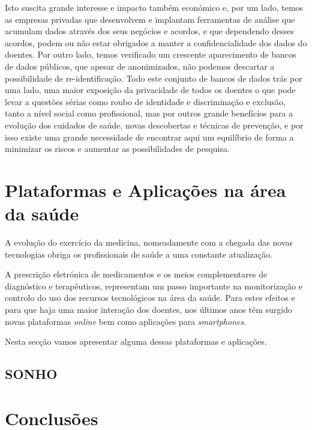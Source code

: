 \documentclass[conference]{IEEEtran}
\begin{document}
Isto suscita grande interesse e impacto também económico e, por um lado, temos as empresas privadas que desenvolvem e implantam ferramentas de análise que acumulam dados através dos seus negócios e acordos, e que dependendo desses acordos, podem ou não estar obrigados a manter a confidencialidade dos dados do doentes. Por outro lado, temos verificado um crescente aparecimento de bancos de dados públicos, que apesar de anonimizados, não podemos descartar a possibilidade de re-identificação. Todo este conjunto de bancos de dados trás por uma lado, uma maior exposição da privacidade de todos os doentes o que pode levar a questões sérias como roubo de identidade e discriminação e exclusão, tanto a nível social como profissional, mas por outros grande benefícios para a evolução dos cuidados de saúde, novas descobertas e técnicas de prevenção, e por isso existe uma grande necessidade de encontrar aqui um equilíbrio de forma a minimizar os riscos e aumentar as possibilidades de pesquisa.


\section{Plataformas e Aplicações na área da saúde}

A evolução do exercício da medicina, nomeadamente com a chegada das novas tecnologias obriga os profissionais de saúde a uma constante atualização.

A prescrição eletrónica de medicamentos e os meios complementares de diagnóstico e terapêuticos, representam um passo importante na monitorização e controlo do uso dos recursos tecnológicos na área da saúde. Para estes efeitos e para que haja uma maior interação dos doentes, nos últimos anos têm surgido novas plataformas \textit{online} bem como aplicações para \textit{smartphones}.

Nesta secção vamos apresentar alguma dessas plataformas e aplicações.


\subsection{SONHO}



\section{Conclusões}


{}

\end{document}
